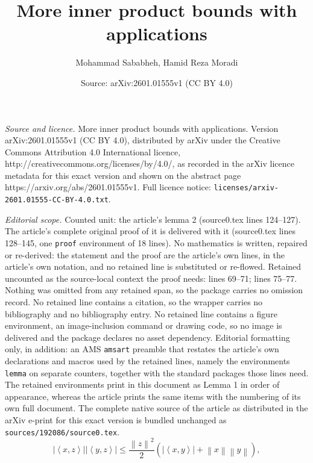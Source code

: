 \documentclass[10pt,a4paper]{amsart}
\title{More inner product bounds with applications}
\author{Mohammad Sababheh, Hamid Reza Moradi}
\date{Source: arXiv:2601.01555v1 (CC BY 4.0)}
\begin{document}
\maketitle

\noindent\emph{Source and licence.} More inner product bounds with applications. Version arXiv:2601.01555v1 (CC BY 4.0), distributed by arXiv under the Creative Commons Attribution 4.0 International licence, http://creativecommons.org/licenses/by/4.0/, as recorded in the arXiv licence metadata for this exact version and shown on the abstract page https://arxiv.org/abs/2601.01555v1. Full licence notice: \texttt{licenses/arxiv-2601.01555-CC-BY-4.0.txt}.\par\smallskip

\noindent\textit{Editorial scope.} Counted unit: the article's lemma 2 (source0.tex lines 124--127). The article's complete original proof of it is delivered with it (source0.tex lines 128--145, one \texttt{proof} environment of 18 lines). No mathematics is written, repaired or re-derived: the statement and the proof are the article's own lines, in the article's own notation, and no retained line is substituted or re-flowed.  Retained uncounted as the source-local context the proof needs: lines 69--71; lines 75--77.  Nothing was omitted from any retained span, so the package carries no omission record.  No retained line contains a citation, so the wrapper carries no bibliography and no bibliography entry.  No retained line contains a figure environment, an image-inclusion command or drawing code, so no image is delivered and the package declares no asset dependency.  Editorial formatting only, in addition: an AMS \texttt{amsart} preamble that restates the article's own declarations and macros used by the retained lines, namely the environments \texttt{lemma} on separate counters, together with the standard packages those lines need.  The retained environments print in this document as Lemma 1 in order of appearance, whereas the article prints the same items with the numbering of its own full document.  The complete native source of the article as distributed in the arXiv e-print for this exact version is bundled unchanged as \texttt{sources/192086/source0.tex}.
\begin{equation}\label{Eq_Buz}
\left| \left\langle x,z \right\rangle  \right|\left| \left\langle y,z \right\rangle  \right|\le \frac{{{\left\| z \right\|}^{2}}}{2}\left( \left| \left\langle x,y \right\rangle  \right|+\left\| x \right\|\left\| y \right\| \right),
\end{equation}
\end{document}
